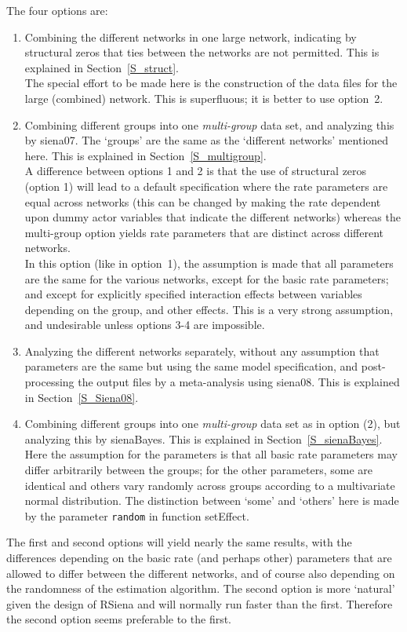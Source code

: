 \documentclass[a4paper,fleqn,11pt]{article}
\newcommand{\+}{\, + \,}
\newcommand{\sfn}[1]{\textsf{#1}}
\newcommand{\RS}{{\sf \textsf{RSiena} }}
\begin{document}
\noindent
The four options are:
\begin{enumerate}
\item Combining the different networks in one large network,
      indicating by structural zeros that ties between the
      networks are not permitted.
      This is explained in Section~\ref{S_struct}.\\
      The special effort to be made here is the construction
      of the data files for the large (combined) network.
      This is superfluous; it is better to use option~2.
\item Combining different groups
      into one \emph{multi-group} data set,
      and analyzing this by \textsf{siena07}.
      The `groups' are the same as the `different networks'
      mentioned here.
      This is explained in Section~\ref{S_multigroup}.\\
      A difference between options 1 and 2 is that the use
      of structural zeros (option 1) will lead to a default specification
      where the rate parameters are equal across networks
      (this can be changed by making the rate dependent upon dummy actor
      variables that indicate the different networks)
      whereas the multi-group option yields rate parameters
      that are distinct across different networks.\\
      In this option (like in option~1), the assumption is made that all
      parameters are the same for the various networks,
      except for the basic rate parameters;
      and except for explicitly specified interaction
      effects between variables depending on the group, and other effects.
      This is a very strong assumption, and undesirable unless
      options 3-4 are impossible.
\item Analyzing the different networks separately, without any assumption
      that parameters are the same but using the same model specification,
      and post-processing the output files by a meta-analysis
      using \textsf{siena08}.
      This is explained in Section~\ref{S_Siena08}.
\item Combining different groups into one \emph{multi-group} data set
      as in option (2), but analyzing this by \textsf{sienaBayes}.
      This is explained in Section~\ref{S_sienaBayes}.\\
      Here the assumption for the parameters is that all basic rate parameters
      may differ arbitrarily between the groups;
      for the other parameters, some are identical and others vary randomly across
      groups according to a multivariate normal distribution.
      The distinction between `some' and `others' here is made by
      the parameter \texttt{random} in function \sfn{setEffect}.
\end{enumerate}
The first and second options will yield nearly the same results, with the
differences depending on the basic rate (and perhaps other) parameters
that are
allowed to differ between the different networks, and of course
also depending on the randomness of the estimation algorithm.
The second option is more `natural' given the design of \RS and
will normally run faster than the first.
Therefore the second option seems preferable to the first.
\end{document}

